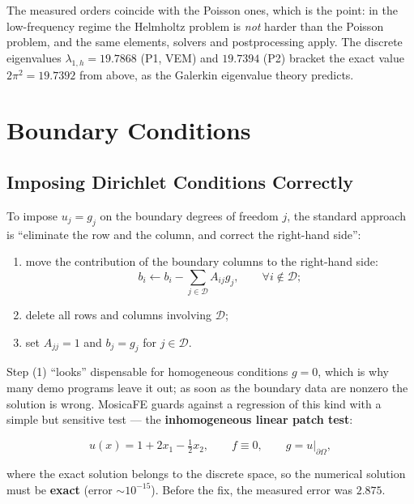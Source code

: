 \documentclass[11pt,oneside]{book}
\theoremstyle{definition}
\theoremstyle{plain}
\newenvironment{caution}{%
  \begin{tcolorbox}[colback=orange!5,colframe=orange!55,title=Caution,fonttitle=\bfseries]%
}{%
  \end{tcolorbox}%
}
\newcommand{\mosica}{\textsf{MosicaFE}}
\begin{document}
The measured orders coincide with the Poisson ones, which is the point: in the
low-frequency regime the Helmholtz problem is \emph{not} harder than the Poisson
problem, and the same elements, solvers and postprocessing apply. The discrete
eigenvalues $\lambda_{1,h}=19.7868$ (P1, VEM) and $19.7394$ (P2) bracket the exact
value $2\pi^2=19.7392$ from above, as the Galerkin eigenvalue theory predicts.

\section{Boundary Conditions}

\subsection{Imposing Dirichlet Conditions Correctly}

To impose $u_j=g_j$ on the boundary degrees of freedom $j$, the standard approach is
``eliminate the row and the column, and correct the right-hand side'':

\begin{enumerate}[label=(\arabic*),itemsep=0.15em]
  \item move the contribution of the boundary columns to the right-hand side:
        \begin{equation}
        b_i \leftarrow b_i-\sum_{j\in\mathcal{D}}A_{ij}g_j,
        \qquad \forall i\notin\mathcal{D};
        \label{eq:bc-lift}
        \end{equation}
  \item delete all rows and columns involving $\mathcal{D}$;
  \item set $A_{jj}=1$ and $b_j=g_j$ for $j\in\mathcal{D}$.
\end{enumerate}

\begin{caution}
Step (1) ``looks'' dispensable for homogeneous conditions $g=0$, which is why many
demo programs leave it out; as soon as the boundary data are nonzero the solution is
wrong. \mosica{} guards against a regression of this kind with a simple but sensitive
test --- the \textbf{inhomogeneous linear patch test}:

\begin{equation}
u(x)=1+2x_1-\tfrac12 x_2,\qquad f\equiv0,\qquad g=u|_{\partial\Omega},
\label{eq:patch}
\end{equation}

where the exact solution belongs to the discrete space, so the numerical solution
must be \textbf{exact} (error $\sim10^{-15}$). Before the fix, the measured error was
$2.875$.
\end{caution}
\end{document}
